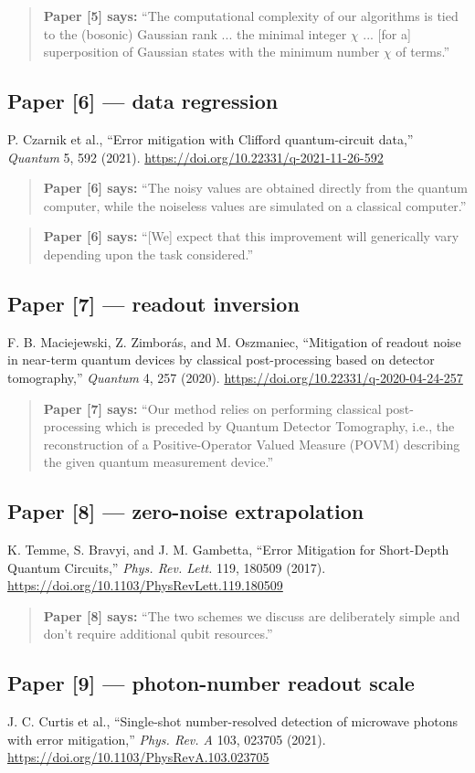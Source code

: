 \documentclass[10pt]{article}
\newcommand{\paperquote}[2]{%
  \begin{quote}\small\textbf{Paper [#1] says:} ``#2''\end{quote}}
\begin{document}
\paperquote{5}{The computational complexity of our algorithms is tied to the (bosonic) Gaussian
rank ... the minimal integer \(\chi\) ... [for a] superposition of Gaussian states with the minimum
number \(\chi\) of terms.}

\subsection*{Paper [6] --- data regression}
P. Czarnik et al., ``Error mitigation with Clifford quantum-circuit data,''
\emph{Quantum} 5, 592 (2021).
\url{https://doi.org/10.22331/q-2021-11-26-592}

\paperquote{6}{The noisy values are obtained directly from the quantum computer, while the noiseless
values are simulated on a classical computer.}
\paperquote{6}{[We] expect that this improvement will generically vary depending upon the task
considered.}

\subsection*{Paper [7] --- readout inversion}
F. B. Maciejewski, Z. Zimbor\'as, and M. Oszmaniec,
``Mitigation of readout noise in near-term quantum devices by classical post-processing based on
detector tomography,'' \emph{Quantum} 4, 257 (2020).
\url{https://doi.org/10.22331/q-2020-04-24-257}

\paperquote{7}{Our method relies on performing classical post-processing which is preceded by
Quantum Detector Tomography, i.e., the reconstruction of a Positive-Operator Valued Measure (POVM)
describing the given quantum measurement device.}

\subsection*{Paper [8] --- zero-noise extrapolation}
K. Temme, S. Bravyi, and J. M. Gambetta, ``Error Mitigation for Short-Depth Quantum Circuits,''
\emph{Phys. Rev. Lett.} 119, 180509 (2017).
\url{https://doi.org/10.1103/PhysRevLett.119.180509}

\paperquote{8}{The two schemes we discuss are deliberately simple and don't require additional
qubit resources.}

\subsection*{Paper [9] --- photon-number readout scale}
J. C. Curtis et al., ``Single-shot number-resolved detection of microwave photons with error
mitigation,'' \emph{Phys. Rev. A} 103, 023705 (2021).
\url{https://doi.org/10.1103/PhysRevA.103.023705}
\end{document}

